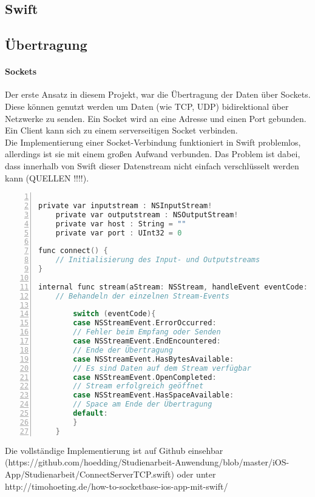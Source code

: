 \subsection{Swift}
\subsection{Übertragung}
\paragraph{Sockets}
Der erste Ansatz in diesem Projekt, war die Übertragung der Daten über Sockets. Diese können genutzt werden um Daten (wie TCP, UDP) bidirektional über Netzwerke zu senden. Ein Socket wird an eine Adresse und einen Port gebunden. Ein Client kann sich zu einem serverseitigen Socket verbinden. \\
Die Implementierung einer Socket-Verbindung funktioniert in Swift problemlos, allerdings ist sie mit einem großen Aufwand verbunden. Das Problem ist dabei, dass innerhalb von Swift dieser Datenstream nicht einfach verschlüsselt werden kann (QUELLEN !!!!). 
\begin{lstlisting}[caption =Implementierung einer Socketverbindung in Swift, language=C, frame=single, breaklines=true,columns=fullflexible, commentstyle=\color{gray}\upshape, captionpos=b, numbers = left]

private var inputstream : NSInputStream!
    private var outputstream : NSOutputStream!
    private var host : String = ""
    private var port : UInt32 = 0

func connect() {        
	// Initialisierung des Input- und Outputstreams
}

internal func stream(aStream: NSStream, handleEvent eventCode: NSStreamEvent) {
	// Behandeln der einzelnen Stream-Events

        switch (eventCode){
        case NSStreamEvent.ErrorOccurred:
		// Fehler beim Empfang oder Senden
        case NSStreamEvent.EndEncountered:
		// Ende der Übertragung
        case NSStreamEvent.HasBytesAvailable:
		// Es sind Daten auf dem Stream verfügbar
        case NSStreamEvent.OpenCompleted:
		// Stream erfolgreich geöffnet
        case NSStreamEvent.HasSpaceAvailable:
		// Space am Ende der Übertragung
        default:
        }
    }

\end{lstlisting}
Die vollständige Implementierung ist auf Github einsehbar (https://github.com/hoedding/Studienarbeit-Anwendung/blob/master/iOS-App/Studienarbeit/ConnectServerTCP.swift) oder unter http://timohoeting.de/how-to-socketbase-ios-app-mit-swift/

